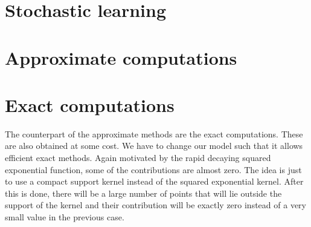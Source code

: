 

\section{Stochastic learning}
\label{sec:stochastic-learning}


\section{Approximate computations}
\label{sec:approximate}


\section{Exact computations}
\label{sec:exact-computations}

The counterpart of the approximate methods are the exact computations. These are also obtained at some cost. We have to change our model such that it allows efficient exact methods. Again motivated by the rapid decaying squared exponential function, some of the contributions are almost zero. The idea is just to use a compact support kernel instead of the squared exponential kernel. After this is done, there will be a large number of points that will lie outside the support of the kernel and their contribution will be exactly zero instead of a very small value in the previous case.


